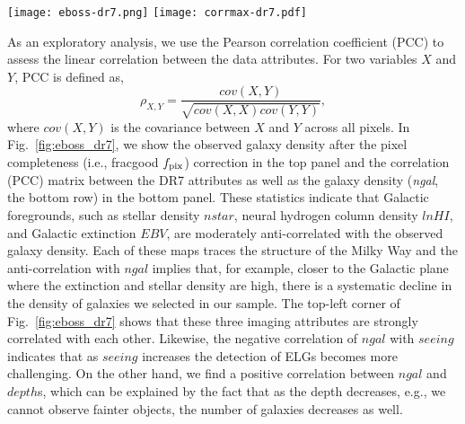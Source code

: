 \documentclass[fleqn, usenatbib]{mnras}
\newcommand{\lnHI}{$lnHI$}
\begin{document}
\begin{figure*}
    \centering
    \texttt{[image: eboss-dr7.png]}
    \texttt{[image: corrmax-dr7.pdf]}
    \caption{\textit{Top panel}: the pixelated density map of eBOSS-like ELGs from the DECaLS DR7 after correcting for the completeness of each pixel and masking based on the survey depth and completeness cuts. The solid red curve represents the Galactic plane. This figure is generated by the code described in \url{https://nbviewer.jupyter.org/github/desihub/desiutil/blob/master/doc/nb/SkyMapExamples.ipynb}. \textit{Bottom panel}: the color-coded Pearson correlation matrix between each pair of the imaging attributes from the DECaLS DR7.}
    \label{fig:eboss_dr7}
\end{figure*}


As an exploratory analysis, we use the Pearson correlation coefficient (PCC) to assess the linear correlation between the data attributes. For two variables $X$ and $Y$, PCC is defined as,
\begin{equation}\label{eq:pcc}
\rho_{X, Y} = \frac{cov(X, Y)}{\sqrt{cov(X,X)cov(Y,Y)}},
\end{equation}
where $cov(X,Y)$ is the covariance between $X$ and $Y$ across all pixels. In Fig.~\ref{fig:eboss_dr7}, we show the observed galaxy density after the pixel completeness (i.e., fracgood $f_{\rm pix}$) correction in the top panel and the correlation (PCC) matrix between the DR7 attributes as well as the galaxy density (\textit{ngal}, the bottom row) in the bottom panel. These statistics indicate that Galactic foregrounds, such as stellar density $nstar$, neural hydrogen column density \lnHI, and Galactic extinction $EBV$, are moderately anti-correlated with the observed galaxy density. Each of these maps traces the structure of the Milky Way and the anti-correlation with $ngal$ implies that, for example, closer to the Galactic plane where the extinction and stellar density are high, there is a systematic decline in the density of galaxies we selected in our sample. The top-left corner of Fig.~\ref{fig:eboss_dr7} shows that these three imaging attributes are strongly correlated with each other. Likewise, the negative correlation of $ngal$ with $seeing$ indicates that as $seeing$ increases the detection of ELGs becomes more challenging. On the other hand, we find a positive correlation between $ngal$ and $depth$s, which can be explained by the fact that as the depth decreases, e.g., we cannot observe fainter objects, the number of galaxies decreases as well.\\
\end{document}
